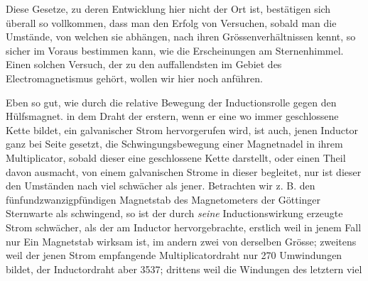 Diese Gesetze, zu deren Entwicklung hier nicht der Ort ist, bestätigen sich überall so vollkommen, dass man den Erfolg von Versuchen, sobald man die Umstände, von welchen sie abhängen, nach ihren Grössenverhältnissen kennt, so sicher im Voraus bestimmen kann, wie die Erscheinungen am Sternenhimmel. Einen solchen Versuch, der zu den auffallendsten im Gebiet des Electromagnetismus gehört, wollen wir hier noch anführen.

Eben so gut, wie durch die relative Bewegung der Inductionsrolle gegen den Hülfsmagnet. in dem Draht der erstern, wenn er eine wo immer geschlossene Kette bildet, ein galvanischer Strom hervorgerufen wird, ist auch, jenen Inductor ganz bei Seite gesetzt, die Schwingungsbewegung einer Magnetnadel in ihrem Multiplicator, sobald dieser eine geschlossene Kette darstellt, oder einen Theil davon ausmacht, von einem galvanischen Strome in dieser begleitet, nur ist dieser den Umständen nach viel schwächer als jener. Betrachten wir z. B. den fünfundzwanzigpfündigen Magnetstab des Magnetometers der Göttinger Sternwarte als schwingend, so ist der durch \textit{seine} Inductionswirkung erzeugte Strom schwächer, als der am Inductor hervorgebrachte, erstlich weil in jenem Fall nur Ein Magnetstab wirksam ist, im andern zwei von derselben Grösse; zweitens weil der jenen Strom empfangende Multiplicatordraht nur 270 Umwindungen bildet, der Inductordraht aber 3537; drittens weil die Windungen des letztern viel
\par\clearpage
{}
